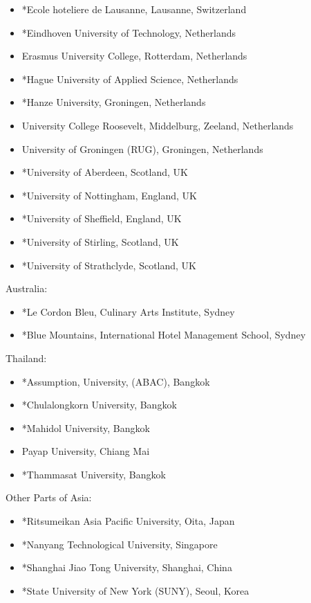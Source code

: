 \begin{itemize}
\item *Ecole hoteliere de Lausanne, Lausanne, Switzerland
\item *Eindhoven University of Technology, Netherlands
\item Erasmus University College, Rotterdam, Netherlands
\item *Hague University of Applied Science, Netherlands
\item *Hanze University, Groningen, Netherlands
\item University College Roosevelt, Middelburg, Zeeland, Netherlands
\item University of Groningen (RUG), Groningen, Netherlands
\item *University of Aberdeen, Scotland, UK
\item *University of Nottingham, England, UK
\item *University of Sheffield, England, UK
\item *University of Stirling, Scotland, UK
\item *University of Strathclyde, Scotland, UK
\end{itemize}

Australia:

\begin{itemize}
\item *Le Cordon Bleu, Culinary Arts Institute, Sydney
\item *Blue Mountains, International Hotel Management School, Sydney
\end{itemize}


Thailand:

\begin{itemize}
\item *Assumption, University, (ABAC), Bangkok
\item *Chulalongkorn University, Bangkok
\item *Mahidol University, Bangkok
\item Payap University, Chiang Mai
\item *Thammasat University, Bangkok
\end{itemize}


Other Parts of Asia:

\begin{itemize}
\item *Ritsumeikan Asia Pacific University, Oita, Japan
\item *Nanyang Technological University, Singapore
\item *Shanghai Jiao Tong University, Shanghai, China
\item *State University of New York (SUNY), Seoul, Korea
\end{itemize}



